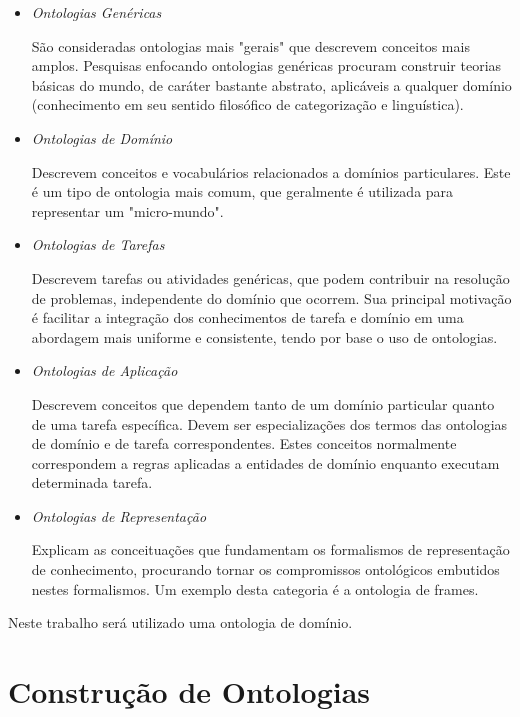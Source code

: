 \begin{itemize}
    \item \textit{Ontologias Genéricas}

    São consideradas ontologias mais "gerais" que descrevem conceitos mais
    amplos. Pesquisas enfocando ontologias genéricas procuram construir teorias
    básicas do mundo, de caráter bastante abstrato, aplicáveis a qualquer domínio
    (conhecimento em seu sentido filosófico de categorização e linguística).

    \item \textit{Ontologias de Domínio}

    Descrevem conceitos e vocabulários relacionados a domínios particulares. Este
    é um tipo de ontologia mais comum, que geralmente é utilizada para representar
    um "micro-mundo".

    \item \textit{Ontologias de Tarefas}

    Descrevem tarefas ou atividades genéricas, que podem contribuir na resolução
    de problemas, independente do domínio que ocorrem. Sua principal motivação
    é facilitar a integração dos conhecimentos de tarefa e domínio em uma
    abordagem mais uniforme e consistente, tendo por base o uso de ontologias.

    \item \textit{Ontologias de Aplicação}

    Descrevem conceitos que dependem tanto de um domínio particular quanto de uma
    tarefa específica. Devem ser especializações dos termos das ontologias de
    domínio e de tarefa correspondentes. Estes conceitos normalmente correspondem
    a regras aplicadas a entidades de domínio enquanto executam determinada tarefa.

    \item \textit{Ontologias de Representação}

    Explicam as conceituações que fundamentam os formalismos de representação de
    conhecimento, procurando tornar os compromissos ontológicos embutidos nestes
    formalismos. Um exemplo desta categoria é a ontologia de frames.

\end{itemize}

Neste trabalho será utilizado uma ontologia de domínio.

\section{Construção de Ontologias}
\label{sec:construção_de_ontologias}

